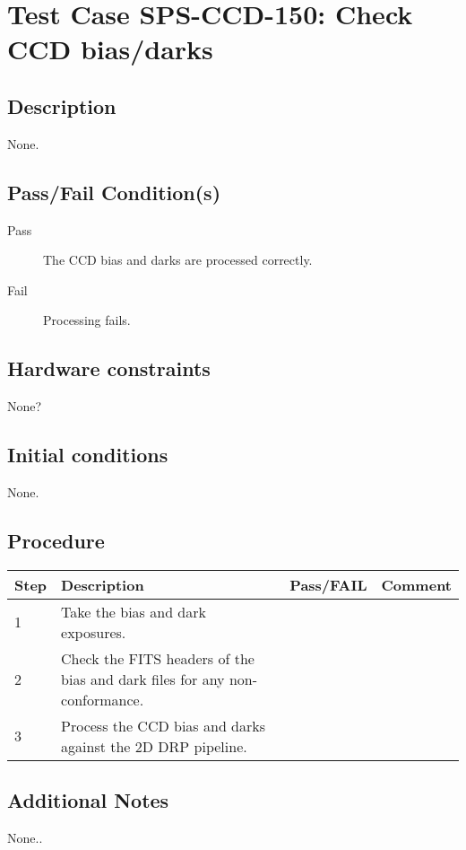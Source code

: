 \section{Test Case SPS-CCD-150: Check CCD bias/darks}

\subsection{Description}

None.

\subsection{Pass/Fail Condition(s)}

\begin{description}
\item [Pass] The CCD bias and darks are processed correctly.
\item [Fail] Processing fails.
\end{description}

\subsection{Hardware constraints}

None?

\subsection{Initial conditions}

None.

\subsection{Procedure}

\begin{table}[H]
    \begin{tabular}{|l| p{5cm} |l| p{5cm} |}
    \hline
    {\bf Step} & {\bf Description} & {\bf Pass/FAIL} & {\bf Comment}  \\ \hline
    1 & Take the bias and dark exposures. &  &  \\ \hline
    2 & Check the FITS headers of the bias and dark files for any non-conformance. &  &  \\ \hline
    3 & Process the CCD bias and darks against the 2D DRP pipeline. &  &  \\ \hline
    \end{tabular}
\end{table}

\subsection{Additional Notes}

None..

